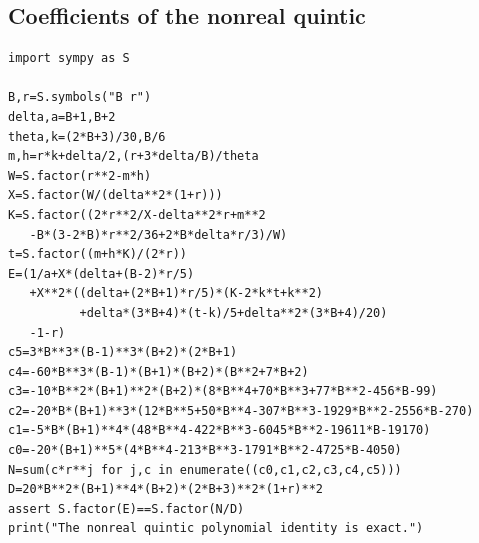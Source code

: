 \documentclass[11pt]{article}
\begin{document}
\subsection{Coefficients of the nonreal quintic}
\begin{verbatim}
import sympy as S

B,r=S.symbols("B r")
delta,a=B+1,B+2
theta,k=(2*B+3)/30,B/6
m,h=r*k+delta/2,(r+3*delta/B)/theta
W=S.factor(r**2-m*h)
X=S.factor(W/(delta**2*(1+r)))
K=S.factor((2*r**2/X-delta**2*r+m**2
   -B*(3-2*B)*r**2/36+2*B*delta*r/3)/W)
t=S.factor((m+h*K)/(2*r))
E=(1/a+X*(delta+(B-2)*r/5)
   +X**2*((delta+(2*B+1)*r/5)*(K-2*k*t+k**2)
          +delta*(3*B+4)*(t-k)/5+delta**2*(3*B+4)/20)
   -1-r)
c5=3*B**3*(B-1)**3*(B+2)*(2*B+1)
c4=-60*B**3*(B-1)*(B+1)*(B+2)*(B**2+7*B+2)
c3=-10*B**2*(B+1)**2*(B+2)*(8*B**4+70*B**3+77*B**2-456*B-99)
c2=-20*B*(B+1)**3*(12*B**5+50*B**4-307*B**3-1929*B**2-2556*B-270)
c1=-5*B*(B+1)**4*(48*B**4-422*B**3-6045*B**2-19611*B-19170)
c0=-20*(B+1)**5*(4*B**4-213*B**3-1791*B**2-4725*B-4050)
N=sum(c*r**j for j,c in enumerate((c0,c1,c2,c3,c4,c5)))
D=20*B**2*(B+1)**4*(B+2)*(2*B+3)**2*(1+r)**2
assert S.factor(E)==S.factor(N/D)
print("The nonreal quintic polynomial identity is exact.")
\end{verbatim}
\end{document}
